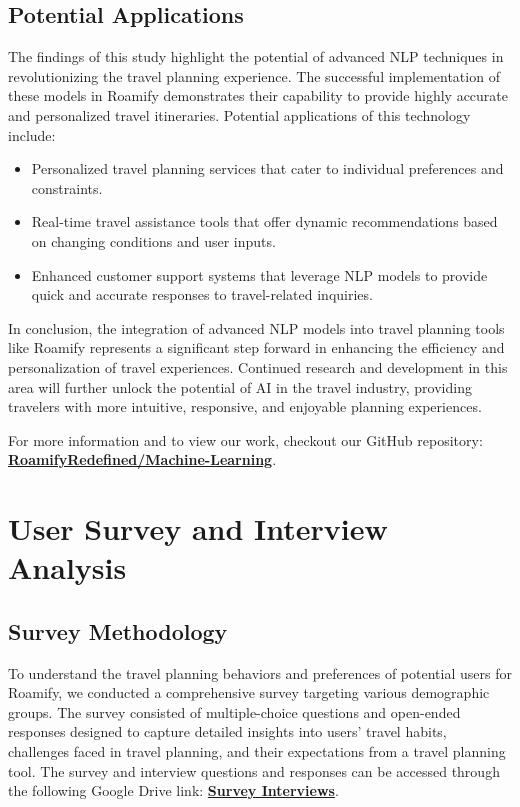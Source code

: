 \documentclass[conference]{IEEEtran}
\begin{document}
    \subsection{Potential Applications}

        The findings of this study highlight the potential of advanced NLP techniques in revolutionizing the travel planning experience. The successful implementation of these models in Roamify demonstrates their capability to provide highly accurate and personalized travel itineraries. Potential applications of this technology include:
        \begin{itemize}
            \item Personalized travel planning services that cater to individual preferences and constraints.
            \item Real-time travel assistance tools that offer dynamic recommendations based on changing conditions and user inputs.
            \item Enhanced customer support systems that leverage NLP models to provide quick and accurate responses to travel-related inquiries.
        \end{itemize}

    In conclusion, the integration of advanced NLP models into travel planning tools like Roamify represents a significant step forward in enhancing the efficiency and personalization of travel experiences. Continued research and development in this area will further unlock the potential of AI in the travel industry, providing travelers with more intuitive, responsive, and enjoyable planning experiences.

    For more information and to view our work, checkout our GitHub repository: \href{https://github.com/RoamifyRedefined/Machine-Learning}{\textbf{RoamifyRedefined/Machine-Learning}}.


\section{User Survey and Interview Analysis}

    \subsection{Survey Methodology}
        To understand the travel planning behaviors and preferences of potential users for Roamify, we conducted a comprehensive survey targeting various demographic groups. The survey consisted of multiple-choice questions and open-ended responses designed to capture detailed insights into users' travel habits, challenges faced in travel planning, and their expectations from a travel planning tool. The survey and interview questions and responses can be accessed through the following Google Drive link: \href{https://drive.google.com/drive/folders/1mKPTXZ7n7ZFmMEK6QBOKU0op3mf8hCta?usp=sharing}{\textbf{Survey Interviews}}.
\end{document}
